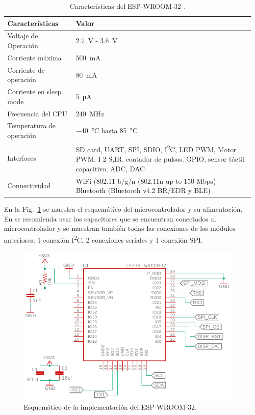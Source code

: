 \bgroup
\def\arraystretch{1.5}%
\begin{table}[htbp!]
\centering
\caption[Características del ESP-WROOM-32]{Características del ESP-WROOM-32 \cite{Esp32_Hardware}.}
\begin{tabular}{@{}lp{9cm}@{}}
\toprule
Características & Valor \\ \midrule
Voltaje de Operación & \SI{2.7}{V} - \SI{3.6}{V} \\
Corriente máxima & \SI{500}{mA} \\
Corriente de operación & \SI{80}{mA} \\
Corriente en sleep mode & \SI{5}{\uA} \\
Frecuencia del CPU & \SI{240}{MHz} \\
Temperatura de operación & \SI{-40}{\celsius} hasta \SI{85}{\celsius} \\
Interfaces & SD card, UART, SPI, SDIO, I\textsuperscript{2}C, LED PWM, Motor PWM, I 2 S,IR, contador de pulsos, GPIO, sensor táctil capacitivo, ADC, DAC \\
Connectividad & WiFi (802.11 b/g/n (802.11n up to 150 Mbps) Bluetooth (Bluetooth v4.2 BR/EDR y BLE)\\\bottomrule
\end{tabular}
\label{diag:ESP32}
\end{table}
\egroup

En la Fig.~\ref{fig:ESP_esquem} se muestra el esquemático del microcontrolador y su alimentación. En \cite{Esp32_Hardware} se recomienda usar los capacitores que se encuentran conectados al microcontrolador y se muestran también todas las conexiones de los módulos anteriores; 1 conexión I\textsuperscript{2}C, 2 conexiones seriales y 1 conexión SPI.

\begin{figure}[hbtp!]
\centering
\includegraphics[width=\textwidth]{ESP32_esquem.pdf}
\caption{Esquemático de la implementación del ESP-WROOM-32.}
\label{fig:ESP_esquem}
\end{figure}

